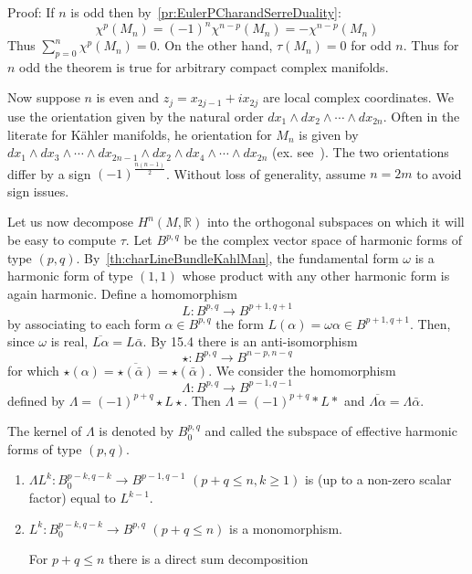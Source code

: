 \documentclass{book}
\newcommand{\R}{{\mathbb{R}}}
\begin{document}
\begin{Proof}
  Proof: If $n$ is odd then by~\cref{pr:EulerPCharandSerreDuality}:
\[
    \chi^p(M_n) = (-1)^n \chi^{n-p}(M_n) = -\chi^{n-p}(M_n)
\]
Thus $\sum_{p=0}^n \chi^p(M_n) = 0$. On the other hand, $\tau(M_n) = 0$ for odd $n$. Thus for $n$ odd the theorem is true for arbitrary compact complex manifolds.

Now suppose $n$ is even and $z_j = x_{2j-1} + i x_{2j}$ are local complex coordinates.  We use the orientation
given by the natural order $dx_1 \wedge dx_2 \wedge \cdots \wedge dx_{2n}$. Often in the literate for K\"ahler
manifolds, he orientation for $M_n$ is given by $dx_1 \wedge dx_3 \wedge \cdots \wedge dx_{2n-1} \wedge dx_2
\wedge dx_4 \wedge \cdots \wedge dx_{2n}$ (ex. see~\cite{hodge1951kahler}). The two orientations differ by a
sign $(-1)^{\frac{n(n-1)}{2}}$. Without loss of generality, assume $n = 2m$ to avoid sign issues.

Let us now decompose $H^n(M, \R)$ into the orthogonal subspaces on which it will be easy to compute $\tau$.
Let $B^{p,q}$ be the complex vector space of harmonic forms of type $(p,q)$.
By~\cref{th:charLineBundleKahlMan}, the fundamental form $\omega$ is a harmonic form of type $(1,1)$ whose
product with any other harmonic form is again harmonic. Define a homomorphism
\[
    L: B^{p,q} \to B^{p+1,q+1}
\]
by associating to each form $\alpha \in B^{p,q}$ the form $L(\alpha) = \omega \alpha \in B^{p+1,q+1}$. Then, since $\omega$ is real, $\overline{L\alpha} = L\bar{\alpha}$. By 15.4 there is an anti-isomorphism
\[
    \star: B^{p,q} \to B^{n-p,n-q}
\]
for which $\star(\alpha) = \overline{\star(\bar{\alpha})} = \star(\bar{\alpha})$. We consider the homomorphism
\[
    \Lambda: B^{p,q} \to B^{p-1,q-1}
\]
defined by $\Lambda = (-1)^{p+q}\star L\star$. Then $\Lambda = (-1)^{p+q}*L*$ and $\overline{\Lambda\alpha} = \Lambda\bar{\alpha}$.

The kernel of $\Lambda$ is denoted by $B_0^{p,q}$ and called the subspace of effective harmonic forms of type $(p,q)$.

\begin{enumerate}
  \item  $\Lambda L^k: B_0^{p-k,q-k} \to B^{p-1,q-1}$ $(p+q \leq n, k \geq 1)$ is (up to a non-zero scalar factor) equal to $L^{k-1}$.

\item $L^k: B_0^{p-k,q-k} \to B^{p,q}$ $(p+q \leq n)$ is a monomorphism.

For $p+q \leq n$ there is a direct sum decomposition


\end{enumerate}
\end{Proof}
\end{document}
